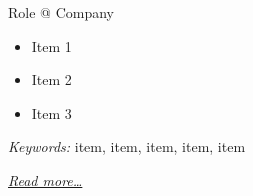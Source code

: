 \large{Role @ Company}

\normalsize
\begin{itemize}
    \item Item 1
    \item Item 2
    \item Item 3
\end{itemize}

\small{\textit{Keywords:} item, item, item, item, item}

\hfill{\small{\textit{\hyperref[sec:template]{Read more…}}}}
\vspace{0.3cm}

